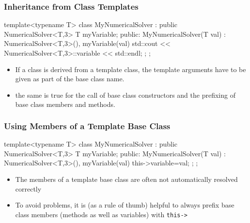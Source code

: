 \documentclass[aspectratio=169,ignorenonframetext,11pt]{beamer}
\def\inline{\lstinline[basicstyle=\small\ttfamily]}
\begin{document}

\begin{frame}[fragile]
\frametitle{Inheritance from Class Templates}
\begin{cppcode}
template<typename T>
class MyNumericalSolver : public NumericalSolver<T,3>
{
    T myVariable;
  public:
    MyNumericalSolver(T val) : NumericalSolver<T,3>(),
                               myVariable(val)
    {
      std::cout << NumericalSolver<T,3>::variable
                << std::endl;
    };
};
\end{cppcode}
\begin{itemize}%
\item If a class is derived from a template class, the template arguments have to be given as
part of the base class name.
\item the same is true for the call of base class constructors and the prefixing
of base class members and methods.
\end{itemize}

\end{frame}



\begin{frame}[fragile]
\frametitle{Using Members of a Template Base Class}
\begin{cppcode}
template<typename T>
class MyNumericalSolver : public NumericalSolver<T,3>
{
    T myVariable;
  public:
    MyNumericalSolver(T val) : NumericalSolver<T,3>(),
                               myVariable(val)
    {
        this->variable=val;
    };
};
\end{cppcode}
\begin{itemize}
\item The members of a template base class are often not automatically resolved correctly
\item To avoid problems, it is (as a rule of thumb) helpful to always prefix
base class members (methods as well as variables) with \inline!this->!
\end{itemize}

\end{frame}


\end{document}
